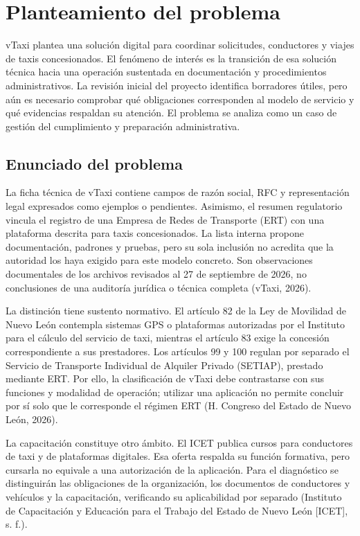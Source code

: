 {\section{Planteamiento del problema}
vTaxi plantea una solución digital para coordinar solicitudes, conductores y viajes de taxis concesionados. El fenómeno de interés es la transición de esa solución técnica hacia una operación sustentada en documentación y procedimientos administrativos. La revisión inicial del proyecto identifica borradores útiles, pero aún es necesario comprobar qué obligaciones corresponden al modelo de servicio y qué evidencias respaldan su atención. El problema se analiza como un caso de gestión del cumplimiento y preparación administrativa.


\subsection{Enunciado del problema}
La ficha técnica de vTaxi contiene campos de razón social, RFC y representación legal expresados como ejemplos o pendientes. Asimismo, el resumen regulatorio vincula el registro de una Empresa de Redes de Transporte (ERT) con una plataforma descrita para taxis concesionados. La lista interna propone documentación, padrones y pruebas, pero su sola inclusión no acredita que la autoridad los haya exigido para este modelo concreto. Son observaciones documentales de los archivos revisados al 27 de septiembre de 2026, no conclusiones de una auditoría jurídica o técnica completa (vTaxi, 2026).


La distinción tiene sustento normativo. El artículo 82 de la Ley de Movilidad de Nuevo León contempla sistemas GPS o plataformas autorizadas por el Instituto para el cálculo del servicio de taxi, mientras el artículo 83 exige la concesión correspondiente a sus prestadores. Los artículos 99 y 100 regulan por separado el Servicio de Transporte Individual de Alquiler Privado (SETIAP), prestado mediante ERT. Por ello, la clasificación de vTaxi debe contrastarse con sus funciones y modalidad de operación; utilizar una aplicación no permite concluir por sí solo que le corresponde el régimen ERT (H. Congreso del Estado de Nuevo León, 2026).


La capacitación constituye otro ámbito. El ICET publica cursos para conductores de taxi y de plataformas digitales. Esa oferta respalda su función formativa, pero cursarla no equivale a una autorización de la aplicación. Para el diagnóstico se distinguirán las obligaciones de la organización, los documentos de conductores y vehículos y la capacitación, verificando su aplicabilidad por separado (Instituto de Capacitación y Educación para el Trabajo del Estado de Nuevo León [ICET], s. f.).


}
